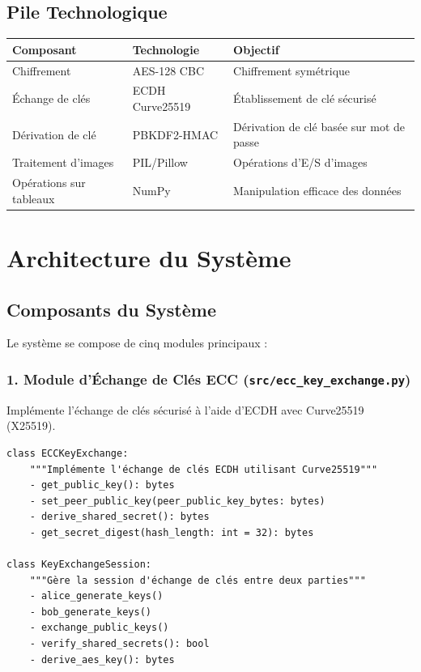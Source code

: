 \documentclass[12pt,a4paper]{report}
\begin{document}
\section{Pile Technologique}

\begin{table}[H]
    \centering
    \begin{tabular}{|l|l|l|}
    \hline
    \textbf{Composant} & \textbf{Technologie} & \textbf{Objectif} \\
    \hline
    Chiffrement & AES-128 CBC & Chiffrement symétrique \\
    Échange de clés & ECDH Curve25519 & Établissement de clé sécurisé \\
    Dérivation de clé & PBKDF2-HMAC & Dérivation de clé basée sur mot de passe \\
    Traitement d'images & PIL/Pillow & Opérations d'E/S d'images \\
    Opérations sur tableaux & NumPy & Manipulation efficace des données \\
    \hline
    \end{tabular}
\end{table}

\chapter{Architecture du Système}

\section{Composants du Système}

Le système se compose de cinq modules principaux :

\subsection{1. Module d'Échange de Clés ECC (\texttt{src/ecc\_key\_exchange.py})}

Implémente l'échange de clés sécurisé à l'aide d'ECDH avec Curve25519 (X25519).

\begin{lstlisting}[caption=Classes d'Échange de Clés ECC]
class ECCKeyExchange:
    """Implémente l'échange de clés ECDH utilisant Curve25519"""
    - get_public_key(): bytes
    - set_peer_public_key(peer_public_key_bytes: bytes)
    - derive_shared_secret(): bytes
    - get_secret_digest(hash_length: int = 32): bytes

class KeyExchangeSession:
    """Gère la session d'échange de clés entre deux parties"""
    - alice_generate_keys()
    - bob_generate_keys()
    - exchange_public_keys()
    - verify_shared_secrets(): bool
    - derive_aes_key(): bytes
\end{lstlisting}
\end{document}
